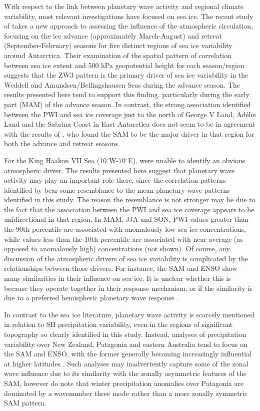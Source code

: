With respect to the link between planetary wave activity and regional climate variability, most relevant investigations have focused on sea ice. The recent study of \citet{Raphael2014} takes a new approach to assessing the influence of the atmospheric circulation, focusing on the ice advance (approximately March-August) and retreat (September-February) seasons for five distinct regions of sea ice variability around Antarctica. Their examination of the spatial pattern of correlation between sea ice extent and 500 hPa geopotential height for each season/region suggests that the ZW3 pattern is the primary driver of sea ice variability in the Weddell and Amundsen/Bellingshausen Seas during the advance season. The results presented here tend to support this finding, particularly during the early part (MAM) of the advance season. In contrast, the strong association identified between the PWI and sea ice coverage just to the north of George V Land, Ad{\'e}lie Land and the Sabrina Coast in East Antarctica does not seem to be in agreement with the results of \citet{Raphael2014}, who found the SAM to be the major driver in that region for both the advance and retreat seasons.

For the King Haakon VII Sea (10$^{\circ}$W-70$^{\circ}$E), \citet{Raphael2014} were unable to identify an obvious atmospheric driver. The results presented here suggest that planetary wave activity may play an important role there, since the correlation patterns identified by \citet{Raphael2014} bear some resemblance to the mean planetary wave patterns identified in this study. The reason the resemblance is not stronger may be due to the fact that the association between the PWI and sea ice coverage appears to be unidirectional in that region. In MAM, JJA and SON, PWI values greater than the 90th percentile are associated with anomalously low sea ice concentrations, while values less than the 10th percentile are associated with near average (as opposed to anomalously high) concentrations (not shown). Of course, any discussion of the atmospheric drivers of sea ice variability is complicated by the relationships between those drivers. For instance, the SAM and ENSO show many similarities in their influence on sea ice. It is unclear whether this is because they operate together in their response mechanism, or if the similarity is due to a preferred hemispheric planetary wave response \citep[e.g.][]{Pezza2012}. 

In contrast to the sea ice literature, planetary wave activity is scarcely mentioned in relation to SH precipitation variability, even in the regions of significant topography so clearly identified in this study. Instead, analyses of precipitation variability over New Zealand, Patagonia and eastern Australia tend to focus on the SAM and ENSO, with the former generally becoming increasingly influential at higher latitudes \citep[e.g.][]{Ummenhofer2007,Aravena2009,Kidston2009,Risbey2009,Garreaud2013,Jiang2013}. Such analyses may inadvertently capture some of the zonal wave influence due to its similarity with the zonally asymmetric features of the SAM, however \citet{Garreaud2013} do note that winter precipitation anomalies over Patagonia are dominated by a wavenumber three mode rather than a more zonally symmetric SAM pattern.

